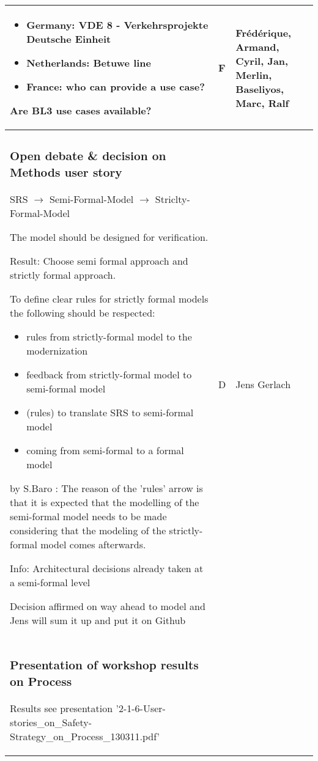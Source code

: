\documentclass[a4paper]{article}
\newcommand{\C}[2]{\newline{\textbf{Comment}}
	\ifthenelse{\isempty{#1}}%
    	{}%
    	{by #1}%
    : #2}
\begin{document}
\begin{longtable}{|p{}|p{}|p{}|}
\begin{itemize}
\item Germany: VDE 8 - Verkehrsprojekte Deutsche Einheit 
\item Netherlands:  Betuwe line
\item France: who can provide a use case?
\end{itemize}

Are BL3 use cases available?
& F
& Fr\'{e}d\'{e}rique, Armand, Cyril, Jan, Merlin, Baseliyos, Marc, Ralf
\\\hline

\subsubsection{Open debate \& decision on Methods user story} %

SRS $\rightarrow$ Semi-Formal-Model $\rightarrow$ Striclty-Formal-Model

The model should be designed for verification.

Result:
Choose semi formal approach and strictly formal approach.

To define clear rules for strictly formal models the following should be respected:
\begin{itemize}
\item rules from strictly-formal model to the modernization
\item feedback from strictly-formal model to semi-formal model
\item (rules) to translate SRS to semi-formal model
\item coming from semi-formal to a formal model
\end{itemize}

\C{S.Baro}{The reason of the 'rules' arrow is that it is expected that the modelling of the semi-formal model needs to be made considering that the modeling of the strictly-formal model comes afterwards.}


Info:
Architectural decisions already taken at a semi-formal level

Decision affirmed on way ahead to model and Jens will sum it up and put it on Github

& D
& Jens Gerlach 
\\\hline
\setcounter{subsubsection}{5}

\subsubsection{Presentation of workshop results on Process} %
Results see presentation '2-1-6-User-stories\_on\_Safety-Strategy\_on\_Process\_130311.pdf'



\end{longtable}
\end{document}
